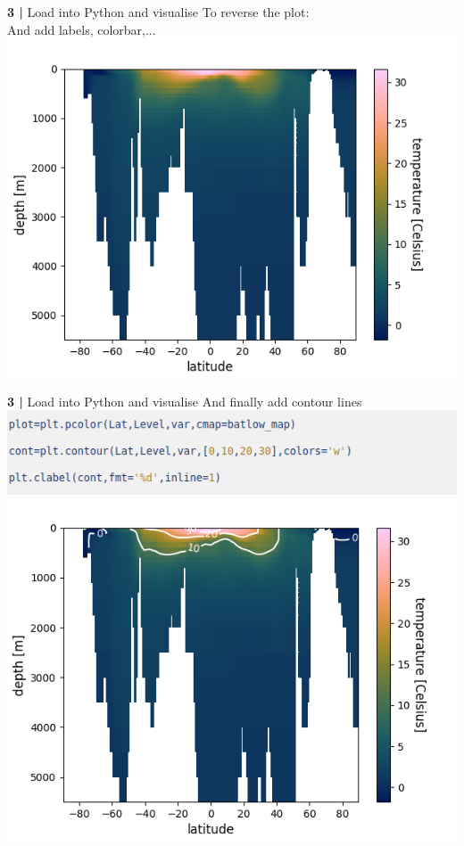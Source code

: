 
\begin{frame}{\textbf{3 |} Load into Python and visualise} 
    To reverse the plot:\\
    And add labels, colorbar,...
    \includegraphics[scale=0.35]{images/script1_fig8.png}
\end{frame}


\begin{frame}{\textbf{3 |} Load into Python and visualise} 
    And finally add contour lines\\
    \includegraphics[scale=0.35]{images/Script1_step12.png}\\
    \includegraphics[scale=0.35]{images/script1_fig9.png}
\end{frame}


